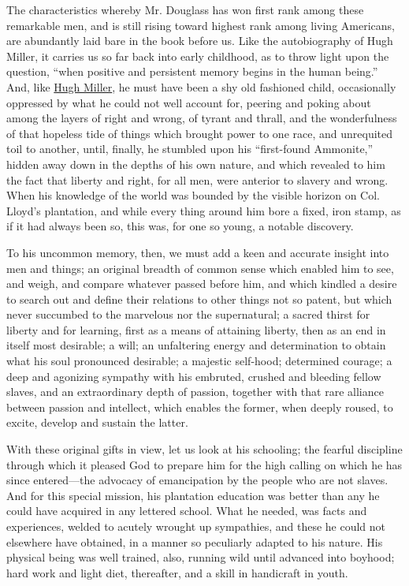 The characteristics whereby Mr. Douglass has won first rank among these
remarkable men, and is still rising toward highest rank among living
Americans, are abundantly laid bare in the book before us. Like the
autobiography of Hugh Miller, it carries us so far back into early
childhood, as to throw light upon the question, ``when positive and
persistent memory begins in the human being.'' And, like
\href{/wiki/Author:Hugh_Miller_(1802-1856)}{Hugh Miller}, he must have
been a shy old fashioned child, occasionally oppressed by what he could
not well account for, peering and poking about among the layers of right
and wrong, of tyrant and thrall, and the wonderfulness of that hopeless
tide of things which brought power to one race, and unrequited toil to
another, until, finally, he stumbled upon his ``first-found Ammonite,''
hidden away down in the depths of his own nature, and which revealed to
him the fact that liberty and right, for all men, were anterior to
slavery and wrong. When his knowledge of the world was bounded by the
visible horizon on Col. Lloyd's plantation, and while every thing around
him bore a fixed, iron stamp, as if it had always been so, this was, for
one so young, a notable discovery.

To his uncommon memory, then, we must add a keen and accurate insight
into men and things; an original breadth of common sense which enabled
him to see, and weigh, and compare whatever passed before him, and which
kindled a desire to search out and define their relations to other
things not so patent, but which never
{\protect\hypertarget{xix}{}{}}succumbed to the marvelous nor the
supernatural; a sacred thirst for liberty and for learning, first as a
means of attaining liberty, then as an end in itself most desirable; a
will; an unfaltering energy and determination to obtain what his soul
pronounced desirable; a majestic self-hood; determined courage; a deep
and agonizing sympathy with his embruted, crushed and bleeding fellow
slaves, and an extraordinary depth of passion, together with that rare
alliance between passion and intellect, which enables the former, when
deeply roused, to excite, develop and sustain the latter.

With these original gifts in view, let us look at his schooling; the
fearful discipline through which it pleased God to prepare him for the
high calling on which he has since entered---the advocacy of
emancipation by the people who are not slaves. And for this special
mission, his plantation education was better than any he could have
acquired in any lettered school. What he needed, was facts and
experiences, welded to acutely wrought up sympathies, and these he could
not elsewhere have obtained, in a manner so peculiarly adapted to his
nature. His physical being was well trained, also, running wild until
advanced into boyhood; hard work and light diet, thereafter, and a skill
in handicraft in youth.

